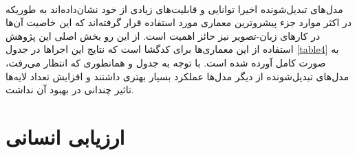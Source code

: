 \paragraph{}{
    مدل‌های تبدیل‌شونده
    اخیرا توانایی و قابلیت‌های زیادی از خود نشان‌‌داده‌اند به طوریکه در اکثر موارد جزء
    پیشروترین معماری مورد استفاده قرار گرفته‌اند که این خاصیت آن‌ها در 
    کارهای زبان-تصویر نیز حائز اهمیت است. از این رو بخش اصلی این پژوهش استفاده از این معماری‌ها برای
    کدگشا است که نتایج این اجراها در جدول 
    \ref{table4}
    به صورت کامل آورده شده است. با توجه به جدول و همانطوری که انتظار می‌رفت، مدل‌های 
    تبدیل‌شونده از دیگر مدل‌ها عملکرد بسیار بهتری داشتند و افزایش تعداد لایه‌ها تاثیر چندانی 
    در بهبود آن نداشت. 
    \begin{table}[h!]
        \centering
        \tiny
        \caption{استفاده از مدل‌های تبدیل شونده به عنوان کدگشا}
        \label{table4}  
    \end{table}
}

\section{ارزیابی انسانی}
\label{sec:human-eval}
